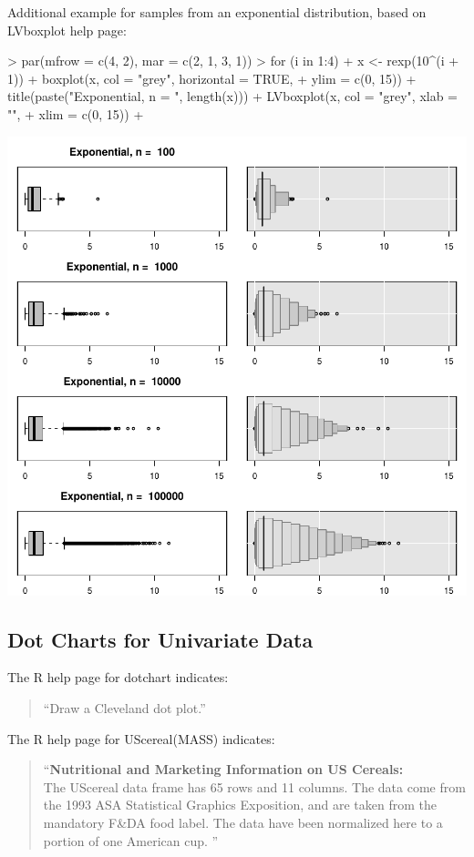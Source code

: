 Additional example for samples from an exponential distribution, based on LVboxplot help page:

\begin{Schunk}
\begin{Sinput}
> par(mfrow = c(4, 2), mar = c(2, 1, 3, 1))
> for (i in 1:4) {
+   x <- rexp(10^(i + 1))
+   boxplot(x, col = "grey", horizontal = TRUE,
+           ylim = c(0, 15))
+   title(paste("Exponential, n = ", length(x)))
+   LVboxplot(x, col = "grey", xlab = "",
+             xlim = c(0, 15))
+ }
\end{Sinput}
\end{Schunk}
\includegraphics{lect_chapter5_v2-016}


\newpage


\subsection{Dot Charts for Univariate Data}\label{DotChartsUnivariateData}


The R help page for dotchart indicates:
\begin{quotation}
``Draw a Cleveland dot plot.''
\end{quotation}


The R help page for UScereal(MASS) indicates:
\begin{quotation}
\noindent
``{\bf Nutritional and Marketing Information on US Cereals:} \\[0.2cm]
%
The UScereal data frame has 65 rows and 11 columns. The data come 
from the 1993 ASA Statistical Graphics Exposition, and are taken from 
the mandatory F\&DA food label. The data have been normalized 
here to a portion of one American cup. ''
\end{quotation}


